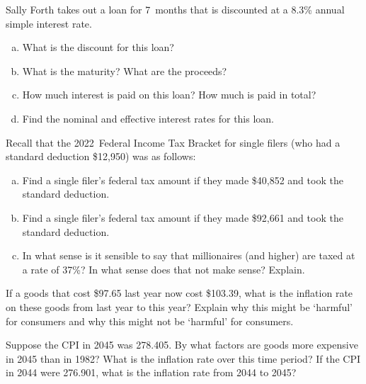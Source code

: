 \documentclass[11pt,letterpaper]{article}
\begin{document}

 Sally Forth takes out a loan for 7~months that is discounted at a 8.3\% annual simple interest rate.
	\begin{enumerate}[(a)]
	\item What is the discount for this loan?
	\item What is the maturity? What are the proceeds?
	\item How much interest is paid on this loan? How much is paid in total?
	\item Find the nominal and effective interest rates for this loan.
	\end{enumerate}



\newpage



 Recall that the 2022~Federal Income Tax Bracket for single filers (who had a standard deduction \$12,950) was as follows:
	\begin{table}[!ht]
	\centering
	\end{table}

	\begin{enumerate}[(a)]
	\item Find a single filer's federal tax amount if they made \$40,852 and took the standard deduction. 
	\item Find a single filer's federal tax amount if they made \$92,661 and took the standard deduction. 
	\item In what sense is it sensible to say that millionaires (and higher) are taxed at a rate of 37\%? In what sense does that not make sense? Explain.
	\end{enumerate}



\newpage



 If a goods that cost \$97.65 last year now cost \$103.39, what is the inflation rate on these goods from last year to this year? Explain why this might be `harmful' for consumers and why this might not be `harmful' for consumers. 



\newpage



 Suppose the CPI in 2045 was 278.405. By what factors are goods more expensive in 2045 than in 1982? What is the inflation rate over this time period? If the CPI in 2044 were 276.901, what is the inflation rate from 2044 to 2045?
\end{document}
